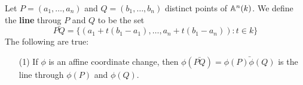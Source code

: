 \begin{example}\label{example_2.4}
  Let $P=(a_1, \dots, a_n)$ and $Q=(b_1, \dots, b_n)$ distinct points of
  $\mathbb{A}^n(k)$. We define the \textbf{line} throug $P$ and $Q$ to be the set
  \begin{equation*}
    \bar{PQ}=\{(a_1+t(b_1-a_1), \dots, a_n+t(b_1-a_n)) : t \in k\}
  \end{equation*}
  The following are true:
  \begin{enumerate}
    \item[(1)] If $\phi$ is an affine coordinate change, then
      $\phi(\bar{PQ})=\bar{\phi(P)\phi(Q)}$ is the line through $\phi(P)$ and
      $\phi(Q)$.


  \end{enumerate}
\end{example}


